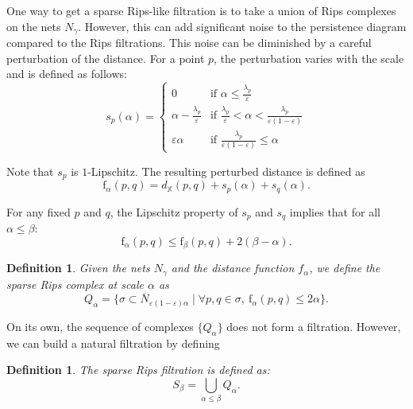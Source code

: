 \documentclass[a4paper]{article}
\newcommand\X{\mathbb{X}}
\newcommand\dX[2]{d_\X(#1,#2)}
\newtheorem{definition}[theorem]{Definition}
\newcommand{\e}{\varepsilon}
\newcommand{\ir}{\lambda}
\newcommand{\net}{N}
\newcommand{\cl}[1]{\overline{#1}}
\newcommand{\ff}{\mathrm{f}}
\begin{document}
One way to get a sparse Rips-like filtration is to take a union of Rips complexes on the nets $N_\gamma$.
However, this can add significant noise to the persistence diagram compared to the Rips filtrations.
This noise can be diminished by a careful perturbation of the distance.
For a point $p$, the perturbation varies with the scale and is defined as follows:
  \[
    s_p(\alpha) = 
      \begin{cases}
        0 & \text{if } \alpha \le \frac{\ir_p}{\e}\\
        \alpha - \frac{\ir_p}{\e} & \text{if } \frac{\ir_p}{\e} < \alpha < \frac{\ir_p}{\e(1-\e)}\\
        \e \alpha & \text{if }  \frac{\ir_p}{\e(1-\e)} \le \alpha 
      \end{cases}
  \]
  
\begin{center}
\end{center}
  
  Note that $s_p$ is $1$-Lipschitz.
  The resulting perturbed distance is defined as
  \[
    \ff_{\alpha}(p,q) = \dX{p}{q} + s_p(\alpha) + s_q(\alpha).
  \]
  
  For any fixed $p$ and $q$, the Lipschitz property of $s_p$ and $s_q$ implies that for all $\alpha\le \beta$:
  \[
    \ff_\alpha(p,q) \le \ff_\beta(p,q) + 2(\beta-\alpha).
  \]

\begin{definition}
Given the nets $N_\gamma$ and the distance function $f_\alpha$, we define the \emph{sparse Rips complex} at scale $\alpha$ as
  \[
    Q_\alpha = \{\sigma\subset\cl\net_{\e(1-\e)\alpha}\mid\forall p,q\in\sigma,\ \ff_\alpha(p,q)\leq 2\alpha\}.
  \]
  \end{definition}
  
  On its own, the sequence of complexes $\{Q_\alpha\}$ does not form a filtration.
  However, we can build a natural filtration by defining 
  
\begin{definition}
The \emph{sparse Rips filtration} is defined as:
  \[
    S_\beta = \bigcup_{\alpha\le \beta} Q_\alpha.
  \]
\end{definition}
\end{document}
